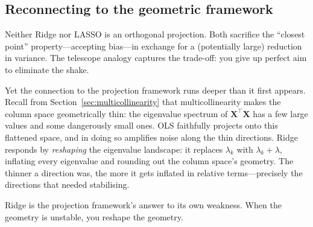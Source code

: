 \documentclass[11pt,a4paper]{article}
\theoremstyle{plain}
\theoremstyle{definition}
\newcommand{\bX}{\bm{X}}
\begin{document}
\subsection{Reconnecting to the geometric framework}

Neither Ridge nor LASSO is an orthogonal projection.
Both sacrifice the ``closest point'' property---accepting bias---in
exchange for a (potentially large) reduction in variance.
The telescope analogy captures the trade-off:
you give up perfect aim to eliminate the shake.

Yet the connection to the projection framework runs deeper than it
first appears.
Recall from Section~\ref{sec:multicollinearity} that
multicollinearity makes the column space geometrically thin:
the eigenvalue spectrum of $\bX^\top\bX$ has a few large values
and some dangerously small ones.
OLS faithfully projects onto this flattened space, and in doing so
amplifies noise along the thin directions.
Ridge responds by \emph{reshaping} the eigenvalue landscape:
it replaces $\lambda_k$ with $\lambda_k + \lambda$, inflating every
eigenvalue and rounding out the column space's geometry.
The thinner a direction was, the more it gets inflated in relative
terms---precisely the directions that needed stabilising.

Ridge is the projection framework's answer to its own weakness.
When the geometry is unstable, you reshape the geometry.


\end{document}
